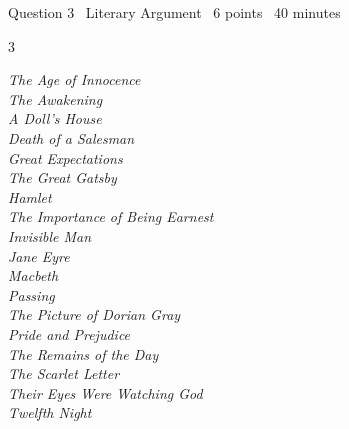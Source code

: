 \documentclass[11pt]{article}
\begin{document}
\begin{frq}{Question 3 \textperiodcentered\ Literary Argument \textperiodcentered\ 6 points \textperiodcentered\ 40 minutes}
\medskip
\begin{multicols}{3}\raggedright\footnotesize
\emph{The Age of Innocence}\\
\emph{The Awakening}\\
\emph{A Doll's House}\\
\emph{Death of a Salesman}\\
\emph{Great Expectations}\\
\emph{The Great Gatsby}\\
\emph{Hamlet}\\
\emph{The Importance of Being Earnest}\\
\emph{Invisible Man}\\
\emph{Jane Eyre}\\
\emph{Macbeth}\\
\emph{Passing}\\
\emph{The Picture of Dorian Gray}\\
\emph{Pride and Prejudice}\\
\emph{The Remains of the Day}\\
\emph{The Scarlet Letter}\\
\emph{Their Eyes Were Watching God}\\
\emph{Twelfth Night}
\end{multicols}
\end{frq}

\makekey
\end{document}

